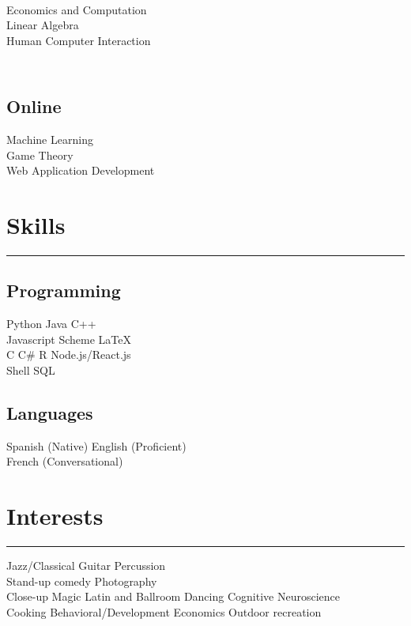 \documentclass[]{dafirebanks-resume-openfont}
\begin{document}
\begin{minipage}[t]{0.33\textwidth}
\underline{}\\
Economics and Computation \\
Linear Algebra \\ 
Human Computer Interaction \\

\subsection{\\Online}
Machine Learning\\
Game Theory\\
Web Application Development\\ 
\sectionsep


\section{Skills}
\vspace{-3pt}
{\color{blue}\hrule width 45pt} \vspace{5pt}
\subsection{Programming}
 Python \textbullet{} Java \textbullet{} C++ \\ \textbullet{} Javascript \textbullet{} Scheme
\textbullet{} \LaTeX \\ \sectionsep
{}
 C \textbullet{} C\# \textbullet{} R \textbullet{} Node.js/React.js \\ \textbullet{} Shell \textbullet{} SQL \\
\sectionsep 
\subsection{Languages}
Spanish (Native) \textbullet{} English (Proficient) \\
\textbullet{} French (Conversational)
\sectionsep


\section{Interests}
\vspace{-3pt}
{\color{blue}\hrule width 78pt \vspace{5pt}}
Jazz/Classical Guitar \textbullet{} Percussion\\
\textbullet{} Stand-up comedy
\textbullet{} Photography\\ 
\textbullet{} Close-up Magic
\textbullet{} Latin and Ballroom Dancing \textbullet{} Cognitive Neuroscience\\
\textbullet{} Cooking 
\textbullet{} Behavioral/Development Economics  
\textbullet{} Outdoor recreation


\end{minipage}
\end{document}
